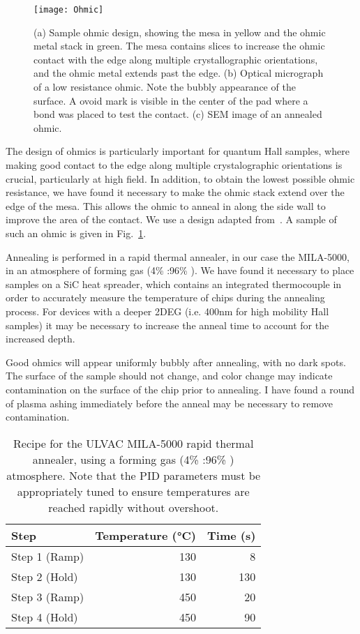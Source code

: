\begin{figure}
    \texttt{[image: Ohmic]}
    \caption[Sample ohmic design and anneal]
    {\label{fig:ohmic}(a) Sample ohmic design, showing the mesa in yellow and the ohmic metal stack in green. The mesa contains slices
    to increase the ohmic contact with the edge along multiple crystallographic orientations, and the ohmic metal extends past the edge.
    (b) Optical micrograph of a low resistance ohmic. Note the bubbly appearance of the surface. A ovoid mark is visible in the center of the
    pad where a bond was placed to test the contact. (c) SEM image of an annealed ohmic.}
\end{figure}

The design of ohmics is particularly important for quantum Hall samples, where making good contact to the edge along multiple
crystalographic orientations is crucial, particularly at high field. In addition, to obtain the lowest possible ohmic resistance,
we have found it necessary to make the ohmic stack extend over the edge of the mesa. This allows the ohmic to anneal in along the
side wall to improve the area of the contact. We use a design adapted from~\cite{2007PhDTM}. A sample of such an ohmic is given in Fig.~\ref{fig:ohmic}.

Annealing is performed in a rapid thermal annealer, in our case the MILA-5000, in an atmosphere of forming gas (4\% :96\% ).
We have found it necessary to place samples on a SiC heat spreader, which contains an integrated thermocouple in order to accurately
measure the temperature of chips during the annealing process. For devices with a deeper 2DEG (i.e. 400nm for high mobility Hall samples)
it may be necessary to increase the anneal time to account for the increased depth.

Good ohmics will appear uniformly bubbly after annealing, with no dark spots. The surface of the sample should not change, and color change
may indicate contamination on the surface of the chip prior to annealing. I have found a round of plasma ashing immediately before the anneal
may be necessary to remove contamination.

\begin{table}
    \centering
    \begin{tabular}{lrr}
        \toprule
        Step & Temperature (\si{\celsius}) & Time (\si{\second}) \\
        \midrule
        Step 1 (Ramp) & 130 & 8 \\
        Step 2 (Hold) & 130 & 130 \\
        Step 3 (Ramp) & 450 & 20 \\
        Step 4 (Hold) & 450 & 90 \\
        \bottomrule
    \end{tabular}
    \caption[Rapid thermal anneal recipe]
    {Recipe for the ULVAC MILA-5000 rapid thermal annealer, using a forming gas (4\% :96\% ) atmosphere. Note that the PID parameters must be appropriately tuned
    to ensure temperatures are reached rapidly without overshoot.}
    \label{tab:anneal}
\end{table}

